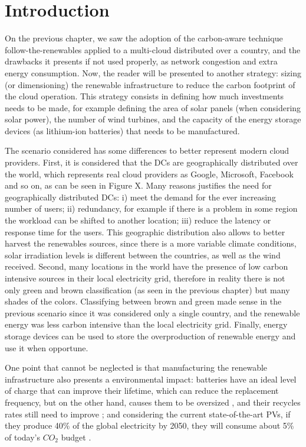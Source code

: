 \section{Introduction}

On the previous chapter, we saw the adoption of the carbon-aware technique follow-the-renewables applied to a multi-cloud distributed over a country, and the drawbacks it presents if not used properly, as network congestion and extra energy consumption. Now, the reader will be presented to another strategy: sizing (or dimensioning) the renewable infrastructure to reduce the carbon footprint of the cloud operation. This strategy consists in defining how much investments needs to be made, for example defining the area of solar panels (when considering solar power), the number of wind turbines, and the capacity of the energy storage devices (as lithium-ion batteries) that needs to be manufactured. 

The scenario considered has some differences to better represent modern cloud providers. First, it is considered that the DCs are geographically distributed over the world, which represents real cloud providers as Google, Microsoft, Facebook and so on, as can be seen in Figure X. Many reasons justifies the need for geographically distributed DCs: i) meet the demand for the ever increasing number of users; ii) redundancy, for example if there is a problem in some region the workload can be shifted to another location; iii) reduce the latency or response time for the users. This geographic distribution also allows to better harvest the renewables sources, since there is a more variable climate conditions, solar irradiation levels is different between the countries, as well as the wind received. Second, many locations in the world have the presence of low carbon intensive sources in their local electricity grid, therefore in reality there is not only green and brown classification (as seen in the previous chapter) but many shades of the colors. Classifying between brown and green made sense in the previous scenario since it was considered only a single country, and the renewable energy was less carbon intensive than the local electricity grid. Finally, energy storage devices can be used to store the overproduction of renewable energy and use it when opportune.

One point that cannot be neglected is that manufacturing the renewable infrastructure also presents a environmental impact: batteries have an ideal level of charge that can improve their lifetime, which can reduce the replacement frequency, but on the other hand, causes them to be oversized \cite{batteries_baumman}, and their recycles rates still need to improve \cite{bateries_RAHMAN}; and considering the current state-of-the-art PVs, if they produce 40\% of the global electricity by 2050, they will consume about 5\% of today’s ${CO_2}$ budget \cite{solar_co2}.

